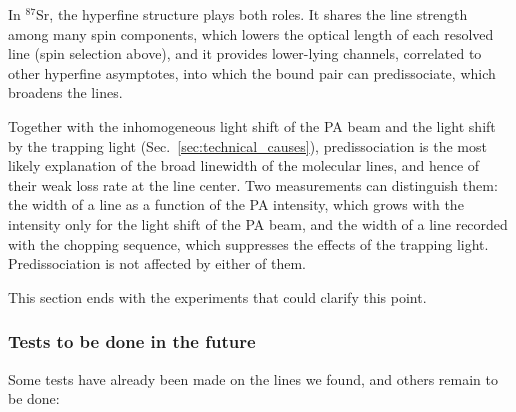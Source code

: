 \begin{itemize}
In $^{87}$Sr, the hyperfine structure plays both roles. It shares the line strength among many
spin components, which lowers the optical length of each resolved line (spin selection above),
and it provides lower-lying channels, correlated to other hyperfine asymptotes, into which the
bound pair can predissociate, which broadens the lines.
\end{itemize}
Together with the inhomogeneous light shift of the PA beam and the light shift by the trapping light (Sec.~\ref{sec:technical_causes}), predissociation is the most likely explanation of the broad linewidth of the molecular lines, and hence of their weak loss rate at the line center. Two measurements can distinguish them: the width of a line as a function of the PA intensity, which grows with the intensity only for the light shift of the PA beam, and the width of a line recorded with the chopping sequence, which suppresses the effects of the trapping light. Predissociation is not affected by either of them. 

This section ends with the experiments that could clarify this point.

\subsubsection{Tests to be done in the future}
\label{sec:tests_future}
Some tests have already been made on the lines we found, and others remain to be done:

